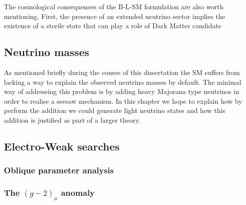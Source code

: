  
The cosmological consequences of the B-L-SM formulation are also worth mentioning.  First, the presence of an extended neutrino sector implies the existence of a sterile state that can play a role of Dark Matter candidate 

\subsection{Neutrino masses}

As mentioned briefly during the course of this dissertation the SM suffers from lacking a way to explain the observed neutrino masses by default. The minimal way of addressing this problem is by adding heavy Majorana type neutrinos in order to realise a seesaw mechanism. In this chapter we hope to explain how by perform the addition we could generate light neutrino states and how this addition is justified as part of a larger theory. 

 
\subsection{Electro-Weak searches}

\subsubsection{ Oblique parameter analysis }

\subsubsection{ The $( g - 2 )_\mu $ anomaly }

